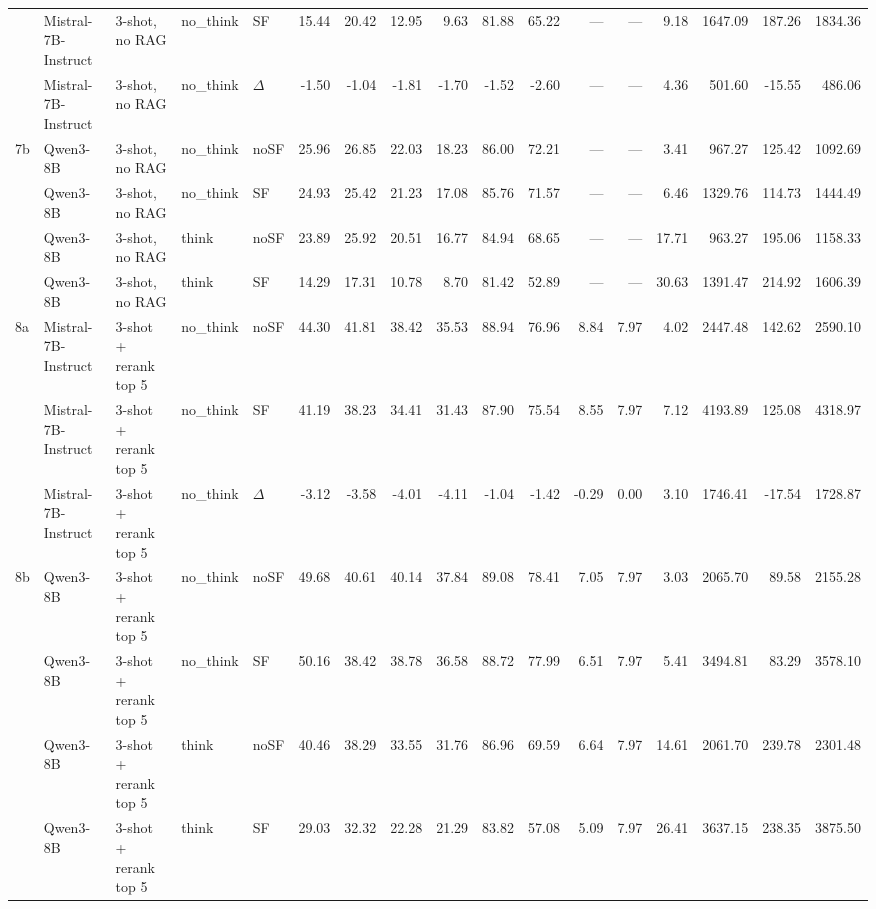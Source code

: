 \begin{landscape}
\begin{footnotesize}
\begin{longtable}{l l l l l r r r r r r r r r r r r}
 & Mistral-7B-Instruct & 3-shot, no RAG & no\_think & SF & 15.44 & 20.42 & 12.95 & 9.63 & 81.88 & 65.22 & --- & --- & 9.18 & 1647.09 & 187.26 & 1834.36 \\
 & Mistral-7B-Instruct & 3-shot, no RAG & no\_think & $\Delta$ & -1.50 & -1.04 & -1.81 & -1.70 & -1.52 & -2.60 & --- & --- & 4.36 & 501.60 & -15.55 & 486.06 \\
7b & Qwen3-8B & 3-shot, no RAG & no\_think & noSF & 25.96 & 26.85 & 22.03 & 18.23 & 86.00 & 72.21 & --- & --- & 3.41 & 967.27 & 125.42 & 1092.69 \\
 & Qwen3-8B & 3-shot, no RAG & no\_think & SF & 24.93 & 25.42 & 21.23 & 17.08 & 85.76 & 71.57 & --- & --- & 6.46 & 1329.76 & 114.73 & 1444.49 \\
 & Qwen3-8B & 3-shot, no RAG & think & noSF & 23.89 & 25.92 & 20.51 & 16.77 & 84.94 & 68.65 & --- & --- & 17.71 & 963.27 & 195.06 & 1158.33 \\
 & Qwen3-8B & 3-shot, no RAG & think & SF & 14.29 & 17.31 & 10.78 & 8.70 & 81.42 & 52.89 & --- & --- & 30.63 & 1391.47 & 214.92 & 1606.39 \\
\midrule
\rowcolor{tabhighlight}8a & Mistral-7B-Instruct & 3-shot + rerank top 5 & no\_think & noSF & 44.30 & 41.81 & 38.42 & 35.53 & 88.94 & 76.96 & 8.84 & 7.97 & 4.02 & 2447.48 & 142.62 & 2590.10 \\
 & Mistral-7B-Instruct & 3-shot + rerank top 5 & no\_think & SF & 41.19 & 38.23 & 34.41 & 31.43 & 87.90 & 75.54 & 8.55 & 7.97 & 7.12 & 4193.89 & 125.08 & 4318.97 \\
 & Mistral-7B-Instruct & 3-shot + rerank top 5 & no\_think & $\Delta$ & -3.12 & -3.58 & -4.01 & -4.11 & -1.04 & -1.42 & -0.29 & 0.00 & 3.10 & 1746.41 & -17.54 & 1728.87 \\
\rowcolor{tabhighlight}\textrightarrow{} 8b & Qwen3-8B & 3-shot + rerank top 5 & no\_think & noSF & 49.68 & 40.61 & 40.14 & 37.84 & 89.08 & 78.41 & 7.05 & 7.97 & 3.03 & 2065.70 & 89.58 & 2155.28 \\
 & Qwen3-8B & 3-shot + rerank top 5 & no\_think & SF & 50.16 & 38.42 & 38.78 & 36.58 & 88.72 & 77.99 & 6.51 & 7.97 & 5.41 & 3494.81 & 83.29 & 3578.10 \\
 & Qwen3-8B & 3-shot + rerank top 5 & think & noSF & 40.46 & 38.29 & 33.55 & 31.76 & 86.96 & 69.59 & 6.64 & 7.97 & 14.61 & 2061.70 & 239.78 & 2301.48 \\
 & Qwen3-8B & 3-shot + rerank top 5 & think & SF & 29.03 & 32.32 & 22.28 & 21.29 & 83.82 & 57.08 & 5.09 & 7.97 & 26.41 & 3637.15 & 238.35 & 3875.50 \\

\end{longtable}
\end{footnotesize}
\end{landscape}
